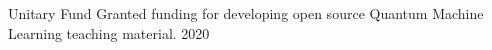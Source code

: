 
\begin{cvhonors}

  \cvhonor
    {Unitary Fund} %
    {Granted funding for developing open source Quantum Machine Learning teaching material.} %
    {} %
    {2020} %


\end{cvhonors}